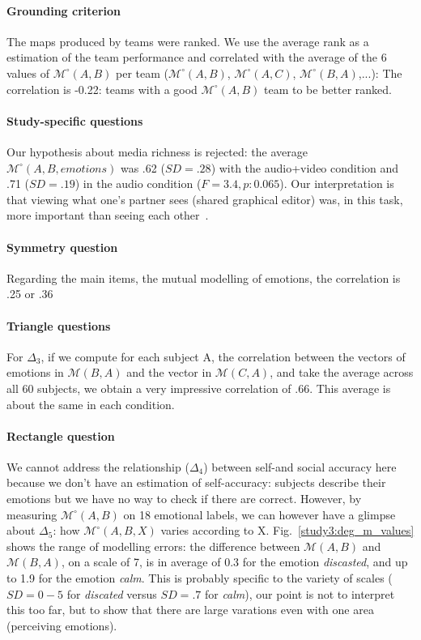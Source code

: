 \documentclass[twocolumn]{article}
\newcommand{\gmodel}[2]{{$\mathcal{M}(#1, #2)$}}
\newcommand{\Model}[3]{{$\mathcal{M}^{\circ}(#1, #2, #3)$}}
\newcommand{\gModel}[2]{{$\mathcal{M}^{\circ}(#1, #2)$}}
\begin{document}
\paragraph{Grounding criterion} The maps produced by teams were ranked. We use
the average rank as a estimation of the team performance and correlated with the
average of the 6 values of \gModel{A}{B} per team (\gModel{A}{B}, \gModel{A}{C},
\gModel{B}{A},...): The correlation is -0.22: teams with a good \gModel{A}{B}
team to be better ranked. 

\paragraph{Study-specific questions} Our hypothesis about media richness is
rejected: the average \Model{A}{B}{emotions} was .62 ($SD = .28$) with the
audio+video condition and .71 ($SD = .19$) in the audio condition ($F=3.4, p:
0.065$). Our interpretation is that viewing what one's partner sees (shared
graphical editor) was, in this task, more important than seeing each
other~\citep{gaver1993one}.

\paragraph{Symmetry question} Regarding the main items, the mutual modelling of
emotions, the correlation is .25 or .36  

\paragraph{Triangle questions}  For $\Delta_3$, if we
compute for each subject A, the correlation between the vectors of emotions in
\gmodel{B}{A} and the vector in \gmodel{C}{A}, and take the average across all
60 subjects, we obtain a very impressive correlation of .66. This average is
about the same in each condition.

\paragraph{Rectangle question} We cannot address the relationship ($\Delta_4$)
between self-and social accuracy here because we don't have an estimation of
self-accuracy: subjects describe their emotions but we have no way to check if
there are correct. However, by measuring \gModel{A}{B} on  18 emotional labels,
we can however have a glimpse about $\Delta_5$: how \Model{A}{B}{X} varies
according to X.  Fig.~\ref{study3:deg_m_values} shows the range of modelling
errors: the difference between \gmodel{A}{B} and \gmodel{B}{A}, on a scale of 7,
is in average of 0.3 for the emotion \emph{discasted}, and up to 1.9 for the
emotion \emph{calm}. This is probably specific to the variety of scales  ($SD=
0-5$ for \emph{discated} versus $SD=.7$ for \emph{calm}), our point is not to
interpret this too far, but to show that there are large varations even with one
area  (perceiving emotions). 
\end{document}
